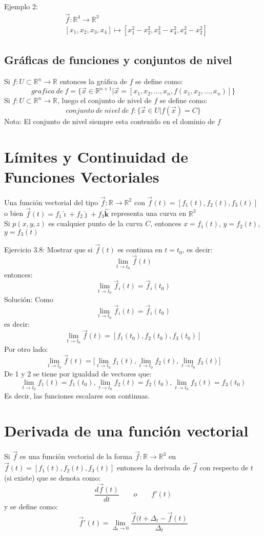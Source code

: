 \documentclass[a4paper]{article}
\newcommand{\ihat}{\boldsymbol{\hat{\imath}}}
\newcommand{\jhat}{\boldsymbol{\hat{\jmath}}}
\newcommand{\khat}{\boldsymbol{\hat{\bm{k}}}}
\begin{document}
Ejemplo 2:
\[
\begin{split}
&\vec{f}:\mathbb{R}^4\longrightarrow\mathbb{R}^3\\
&[x_1,x_2,x_3,x_4]\longmapsto[x_1^2-x_2^2,x_3^2-x_4^2,x_4^2-x_2^2]
\end{split}
\]
\subsection{Gráficas de funciones y conjuntos de nivel}
Si $f:U\subset\mathbb{R}^n\rightarrow\mathbb{R}$ entonces la gráfica de $f$ se define como:
\[grafica\ de\ f=\{\vec{x}\in\mathbb{R}^{n+1}\big|\vec{x}=[x_1,x_2,\ldots,x_n,f(x_1,x_2,\ldots,x_n)]\}\]
Si $f:U\subset\mathbb{R}^n\longrightarrow\mathbb{R}$, luego el conjunto de nivel de $f$ se define como:
\[conjunto\ de\ nivel\ de\ f:\{\vec{x}\in U\big|f(\vec{x})=C\}\]
{\small Nota: El conjunto de nivel siempre esta contenido en el dominio de $f$}
\section{Límites y Continuidad de Funciones Vectoriales}
Una función vectorial del tipo $\vec{f}:\mathbb{R}\longrightarrow\mathbb{R}^2$ con $\vec{f}(t)=[f_1(t),f_2(t),f_3(t)]$
o bien $\vec{f}(t)=f_1\ihat+f_2\jhat+f_3\khat$ representa una curva en $\mathbb{R}^3$\\
Si $p(x,y,z)$ es cualquier punto de la curva $C$, entonces $x=f_1(t)$, $y=f_2(t)$, $y=f_3(t)$

Ejercicio 3.8: Mostrar que si $\vec{f}(t)$ es continua en $t=t_0$, es decir:
\[\lim_{t\rightarrow t_0} \vec{f}(t)\]
entonces:
\[\lim_{t\rightarrow t_0}\vec{f}_i(t)=\vec{f}_i(t_0)\]
Solución: Como
\[\lim_{t\rightarrow t_0}\vec{f}_i(t)=\vec{f}_i(t_0)\]
es decir:
\begin{equation}\lim_{t\rightarrow t_0} \vec{f}(t)=[f_1(t_0),f_2(t_0),f_3(t_0)] \end{equation}
Por otro lado:
\begin{equation}
\lim_{t\rightarrow t_0} \vec{f}(t)=\Big[\lim_{t\rightarrow t_0} f_1(t),\lim_{t\rightarrow t_0} f_2(t),\lim_{t\rightarrow t_0} f_3(t)\Big]
\end{equation}
De 1 y 2 se tiene por igualdad  de vectores que:
\[\lim_{t\rightarrow t_0} f_1(t)=f_1(t_0),\lim_{t\rightarrow t_0} f_2(t)=f_2(t_0),\lim_{t\rightarrow t_0} f_3(t)=f_3(t_0)\]
Es decir, las funciones escalares son continuas.
\section{Derivada de una función vectorial}
Si $\vec{f}$ es una función vectorial de la forma $\vec{f}:\mathbb{R}\longrightarrow\mathbb{R}^3$ en $\vec{f}(t)=[f_1(t),f_2(t),f_3(t)]$ entonces la derivada de $\vec{f}$ con respecto de $t$ (si existe) que se denota como:
\[\frac{d\vec{f}(t)}{dt}\qquad o\qquad f'(t)\]
y se define como:
\[\vec{f}'(t)=\lim_{\Delta_t\rightarrow 0} \frac{\vec{f}(t+\Delta_t - \vec{f}(t)}{\Delta_t}\]
\end{document}
